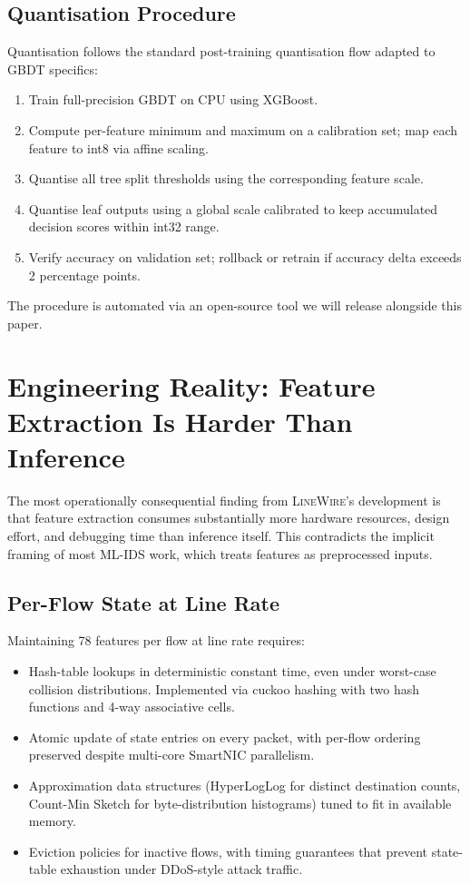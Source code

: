 \documentclass[sigconf,nonacm]{acmart}
\begin{document}
\subsection{Quantisation Procedure}

Quantisation follows the standard post-training quantisation flow
adapted to GBDT specifics:

\begin{enumerate}
  \item Train full-precision GBDT on CPU using XGBoost.
  \item Compute per-feature minimum and maximum on a calibration
        set; map each feature to int8 via affine scaling.
  \item Quantise all tree split thresholds using the corresponding
        feature scale.
  \item Quantise leaf outputs using a global scale calibrated to keep
        accumulated decision scores within int32 range.
  \item Verify accuracy on validation set; rollback or retrain if
        accuracy delta exceeds 2 percentage points.
\end{enumerate}

The procedure is automated via an open-source tool we will release
alongside this paper.

\section{Engineering Reality: Feature Extraction Is Harder Than Inference}

The most operationally consequential finding from \textsc{LineWire}'s
development is that feature extraction consumes substantially more
hardware resources, design effort, and debugging time than inference
itself. This contradicts the implicit framing of most ML-IDS work, which
treats features as preprocessed inputs.

\subsection{Per-Flow State at Line Rate}

Maintaining 78 features per flow at line rate requires:

\begin{itemize}
  \item Hash-table lookups in deterministic constant time, even under
        worst-case collision distributions. Implemented via cuckoo
        hashing with two hash functions and 4-way associative cells.
  \item Atomic update of state entries on every packet, with
        per-flow ordering preserved despite multi-core SmartNIC
        parallelism.
  \item Approximation data structures (HyperLogLog for distinct
        destination counts, Count-Min Sketch for byte-distribution
        histograms) tuned to fit in available memory.
  \item Eviction policies for inactive flows, with timing guarantees
        that prevent state-table exhaustion under DDoS-style attack
        traffic.
\end{itemize}
\end{document}

